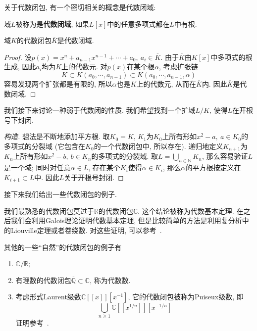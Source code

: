关于代数闭包, 有一个密切相关的概念是代数闭域:
\begin{defn}
    域$L$被称为是\textbf{代数闭域}, 如果$L[x]$中的任意多项式都在$L$中有根.
\end{defn}
\begin{prop}
    域$K$的代数闭包$\overline{K}$是代数闭域.
\end{prop}
\begin{proof}
    设$p(x)=x^n+a_{n-1}x^{n-1}+\cdots+a_0,\ a_i\in\overline{K}$.
    由于$\overline{K}$由$K[x]$中多项式的根生成, 因此$a_i$均为$K$上的代数元.
    对$p(x)$在某个根$\alpha$, 考虑扩张链
    \[K\subset K(a_0,\cdots,a_{n-1})\subset K(a_0,\cdots,a_{n-1},\alpha)\]
    容易发现两个扩张都是有限的, 所以$\alpha$也是$K$上的代数元, 从而在$\overline{K}$内.
    因此$\overline{K}$是代数闭域.
\end{proof}

我们接下来讨论一种弱于代数闭的性质.
我们希望找到一个扩域$L/K$, 使得$L$在开根号下封闭.
\begin{proof}[构造]
    想法是不断地添加平方根.
    取$K_0=K$, $K_1$为$K_0$上所有形如$x^2-a,\ a\in K_0$的多项式的分裂域 (它包含在$K_0$的一个代数闭包中, 所以存在).
    递归地定义$K_{n+1}$为$K_n$上所有形如$x^2-b,\ b\in K_n$的多项式的分裂域.
    取$L=\bigcup_{n\in\mathbb{N}}K_n$, 那么容易验证$L$是一个域;
    同时对任意$\alpha\in L$, 存在某个$K_i$使得$\alpha\in K_i$, 那么$\alpha$的平方根按定义在$K_{i+1}\subset L$中.
    因此$L$关于开根号封闭.
\end{proof}

接下来我们给出一些代数闭包的例子.
\begin{eg}
    我们最熟悉的代数闭包莫过于$\mathbb{R}$的代数闭包$\mathbb{C}$.
    这个结论被称为代数基本定理.
    在之后我们会利用Galois理论证明代数基本定理, 但是比较简单的方法是利用复分析中的Liouville定理或者卷绕数.
    对这些证明, 可以参考~\parencite[命题8.13]{Lvovski}.
\end{eg}

其他的一些``自然''的代数闭包的例子有
\begin{eg}
    \begin{enumerate}
        \item $\mathbb{C}/\mathbb{R}$;
        \item 有理数的代数闭包$\overline{\mathbb{Q}}\subset\mathbb{C}$, 称为代数数.
        \item 考虑形式Laurent级数$\mathbb{C}[[x]][x^{-1}]$, 它的代数闭包被称为Puiseux级数, 即
        \[\bigcup_{n\geq 1}\mathbb{C}[[x^{1/n}]][x^{-1/n}]\]
        证明参考~\parencite[命题II.8]{Serre}.
    \end{enumerate}
\end{eg}

